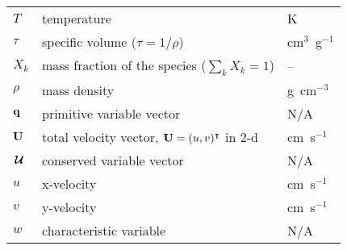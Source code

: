 \begin{center}
\begin{longtable}{|l|p{4.0in}|l|}
%
$T$     & temperature                                & K \\
%
$\tau$  & specific volume ($\tau = 1/\rho$)          & cm$^3$~g$^{-1}$ \\
%
$X_k$   & mass fraction of the species ($\sum_k X_k = 1$) & -- \\
%
$\rho$  & mass density  & g~cm$^{-3}$ \\
%
${\bf q}$     & primitive variable vector                 & N/A \\
%
${\bf U}$   & total velocity vector, ${\bf U} = (u, v)^\intercal$ in 2-d & cm~s$^{-1}$ \\
%
${\,\boldsymbol{\mathcal{U}}}$   & conserved variable vector & N/A \\
%
$u$     & x-velocity   & cm~s$^{-1}$ \\
%
$v$     & y-velocity   & cm~s$^{-1}$ \\
%
$w$     & characteristic variable                   & N/A \\
%
\end{longtable}
\end{center}
\renewcommand{\arraystretch}{1.0}


